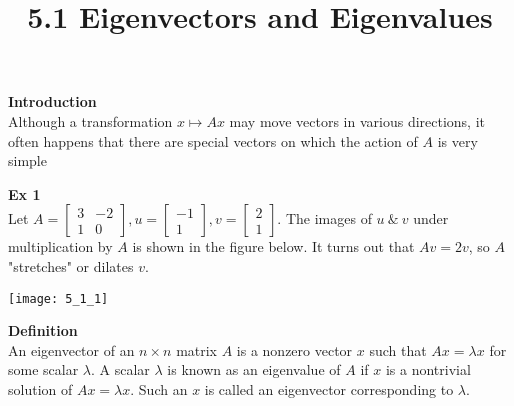 \documentclass{article}
\title{5.1 Eigenvectors and Eigenvalues}
\begin{document}
  \maketitle
  \textbf{Introduction}\\
  Although a transformation $ x \mapsto Ax $ may move vectors in various directions, it often happens that there are special vectors on which the action of $ A $ is very simple

  \textbf{Ex 1}\\
  Let $ A=\begin{bmatrix}
      3 &-2\\
      1 &0
  \end{bmatrix}, u=
  \begin{bmatrix}
      -1\\
      1
  \end{bmatrix},
  v=\begin{bmatrix}
      2\\
      1
  \end{bmatrix} $. The images of $ u ~\&~ v $ under multiplication by $ A $ is shown in the figure below. It turns out that $ Av=2v $, so $ A $ "stretches" or dilates $ v $.
  \begin{center}
      \texttt{[image: 5\_1\_1]}
  \end{center}

  \textbf{Definition}\\
  An eigenvector of an $ n \times n $ matrix $ A $ is a nonzero vector $ x $ such that $ Ax=\lambda x $ for some scalar $ \lambda $. A scalar $ \lambda $ is known as an eigenvalue of $ A $ if $ x $ is a nontrivial solution of $ Ax=\lambda x $. Such an $ x $ is called an eigenvector corresponding to $ \lambda $.
\end{document}
